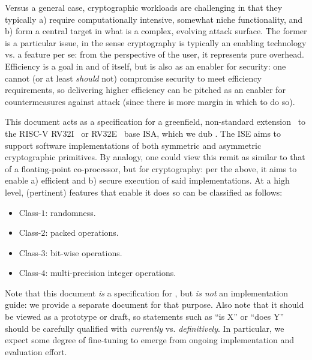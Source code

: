 
Versus a general case, cryptographic workloads are challenging in that they
typically
a) require computationally intensive, somewhat niche functionality,
   and
b) form a central target in what is a complex, evolving attack surface.
The former is a particular issue, in the sense cryptography is typically an
enabling technology vs. a feature per se: from the perspective of the user,
it represents pure overhead.  Efficiency is a goal in and of itself, but is
also as an enabler for security: one cannot (or at least {\em should} not)
compromise security to meet efficiency requirements, so delivering higher
efficiency can be pitched as an enabler for countermeasures against attack
(since there is more margin in which to do so).

This document acts as a specification for a 
greenfield, non-standard extension~\cite[Section 21.1]{SCARV:RV:ISA:I:17} 
to the RISC-V 
RV32I~\cite[Section 2]{SCARV:RV:ISA:I:17}
or
RV32E~\cite[Section 3]{SCARV:RV:ISA:I:17}
base 
ISA, which we dub \ISE.
The \ISE ISE aims to support software implementations of both symmetric and 
asymmetric cryptographic primitives.  By analogy, one could view this remit
as similar to that of a floating-point co-processor, but for cryptography: 
per the above, it aims to enable
a) efficient
   and
b) secure
execution of said implementations.  At a high level, (pertinent) features 
that enable it does so can be classified as follows:

\begin{itemize}
\item Class-$1$: randomness.
\item Class-$2$: packed                  operations.
\item Class-$3$: bit-wise                operations.
\item Class-$4$: multi-precision integer operations.
\end{itemize}

\noindent
Note that this document {\em is} a specification for \ISE, but {\em is not} 
an implementation guide: we provide a separate document for that purpose.
Also note that it should be viewed as a prototype or draft, so statements 
such as 
``\ISE is   X'' 
or
``\ISE does Y''
should be carefully qualified with {\em currently} vs. {\em definitively}.  
In particular, we expect some degree of fine-tuning to emerge from ongoing
implementation and evaluation effort.

